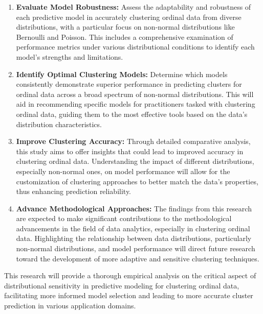 \documentclass{article}
\begin{document}
\begin{enumerate}
    \item \textbf{Evaluate Model Robustness:} Assess the adaptability and robustness of each predictive model in accurately clustering ordinal data from diverse distributions, with a particular focus on non-normal distributions like Bernoulli and Poisson. This includes a comprehensive examination of performance metrics under various distributional conditions to identify each model's strengths and limitations.
    \item \textbf{Identify Optimal Clustering Models:} Determine which models consistently demonstrate superior performance in predicting clusters for ordinal data across a broad spectrum of non-normal distributions. This will aid in recommending specific models for practitioners tasked with clustering ordinal data, guiding them to the most effective tools based on the data's distribution characteristics.
    \item \textbf{Improve Clustering Accuracy:} Through detailed comparative analysis, this study aims to offer insights that could lead to improved accuracy in clustering ordinal data. Understanding the impact of different distributions, especially non-normal ones, on model performance will allow for the customization of clustering approaches to better match the data's properties, thus enhancing prediction reliability.
    \item \textbf{Advance Methodological Approaches:} The findings from this research are expected to make significant contributions to the methodological advancements in the field of data analytics, especially in clustering ordinal data. Highlighting the relationship between data distributions, particularly non-normal distributions, and model performance will direct future research toward the development of more adaptive and sensitive clustering techniques.
\end{enumerate}

This research will provide a thorough empirical analysis on the critical aspect of distributional sensitivity in predictive modeling for clustering ordinal data, facilitating more informed model selection and leading to more accurate cluster prediction in various application domains.

\printbibliography
\end{document}

